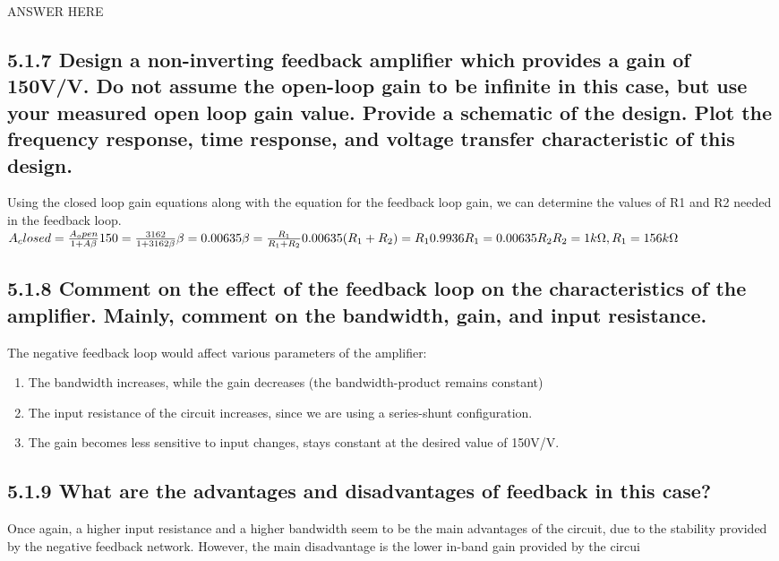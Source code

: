 \documentclass[12pt]{article}
\begin{document}
ANSWER HERE

\subsection*{5.1.7 Design a non-inverting feedback amplifier which provides a gain of 150V/V. 
Do not assume the open-loop gain to be infinite in this case, but use your measured open loop 
gain value. Provide a schematic of the design. Plot the frequency response, time response, and 
voltage transfer characteristic of this design. }

Using the closed loop gain equations along with the equation for the feedback loop gain, we can determine the values of R1 and R2 needed in the feedback loop.
\newline
$A_closed  = \frac{A_open}{1 + A\beta}\\
\\
150 = \frac{3162}{1 + 3162\beta}\\
\\
\beta = 0.00635\\
\\
\beta = \frac{R_1}{R_1 + R_2}\\
\\
0.00635(R_1 + R_2) = R_1\\
\\
0.9936R_1 = 0.00635R_2\\
\\
R_2 = 1k\Omega, R_1 = 156k\Omega
$

\subsection*{5.1.8 Comment on the effect of the feedback loop on the characteristics of the 
amplifier. Mainly, comment on the bandwidth, gain, and input resistance.}

The negative feedback loop would affect various parameters of the amplifier:
\begin{enumerate}
\item
The bandwidth increases, while the gain decreases (the bandwidth-product remains constant)
\item
The input resistance of the circuit increases, since we are using a series-shunt configuration.
\item
The gain becomes less sensitive to input changes, stays constant at the desired value of 150V/V.
\end{enumerate}

\subsection*{5.1.9 What are the advantages and disadvantages of feedback in this case?}

Once again, a higher input resistance and a higher bandwidth seem to be the main advantages of the circuit, due to the stability provided by the negative feedback network. However, the main disadvantage is the lower in-band gain provided by the circui
\end{document}
